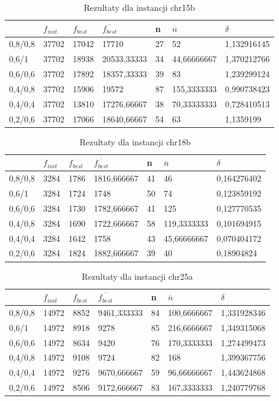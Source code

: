 \begin{table}[H]
\label{T3_chr15b}
\begin{tabular}{l l l l l l l}
\hline
 & $f_{init}$ & $f_{best}$ & $\overline{f_{best}}$ & n & $\overline{n}$ & $\delta$ \\
\hline
0,8/0,8 & 37702 & 17042 & 17710 & 27 & 52 & 1,132916145\\
0,6/1 & 37702 & 18938 & 20533,33333 & 34 & 44,66666667 & 1,370212766\\
0,6/0,6 & 37702 & 17892 & 18357,33333 & 39 & 83 & 1,239299124\\
0,4/0,8 & 37702 & 15906 & 19572 & 87 & 155,3333333 & 0,990738423\\
0,4/0,4 & 37702 & 13810 & 17276,66667 & 38 & 70,33333333 & 0,728410513\\
0,2/0,6 & 37702 & 17066 & 18640,66667 & 54 & 63 & 1,1359199\\
\hline
\end{tabular}
\caption{Rezultaty dla instancji chr15b}
\end{table}

\begin{table}[H]
\label{T3_chr18b}
\begin{tabular}{l l l l l l l}
\hline
 & $f_{init}$ & $f_{best}$ & $\overline{f_{best}}$ & n & $\overline{n}$ & $\delta$ \\
\hline
0,8/0,8 & 3284 & 1786 & 1816,666667 & 41 & 46 & 0,164276402\\
0,6/1 & 3284 & 1724 & 1748 & 50 & 74 & 0,123859192\\
0,6/0,6 & 3284 & 1730 & 1782,666667 & 41 & 125 & 0,127770535\\
0,4/0,8 & 3284 & 1690 & 1722,666667 & 58 & 119,3333333 & 0,101694915\\
0,4/0,4 & 3284 & 1642 & 1758 & 43 & 45,66666667 & 0,070404172\\
0,2/0,6 & 3284 & 1824 & 1882,666667 & 39 & 40 & 0,18904824\\
\hline
\end{tabular}
\caption{Rezultaty dla instancji chr18b}
\end{table}

\begin{table}[H]
\label{T3_chr25a}
\begin{tabular}{l l l l l l l}
\hline
 & $f_{init}$ & $f_{best}$ & $\overline{f_{best}}$ & n & $\overline{n}$ & $\delta$ \\
\hline
0,8/0,8 & 14972 & 8852 & 9461,333333 & 84 & 100,6666667 & 1,331928346\\
0,6/1 & 14972 & 8918 & 9278 & 85 & 216,6666667 & 1,349315068\\
0,6/0,6 & 14972 & 8634 & 9420 & 76 & 170,3333333 & 1,274499473\\
0,4/0,8 & 14972 & 9108 & 9724 & 82 & 168 & 1,399367756\\
0,4/0,4 & 14972 & 9276 & 9670,666667 & 59 & 96,66666667 & 1,443624868\\
0,2/0,6 & 14972 & 8506 & 9172,666667 & 83 & 167,3333333 & 1,240779768\\
\hline
\end{tabular}
\caption{Rezultaty dla instancji chr25a}
\end{table}


